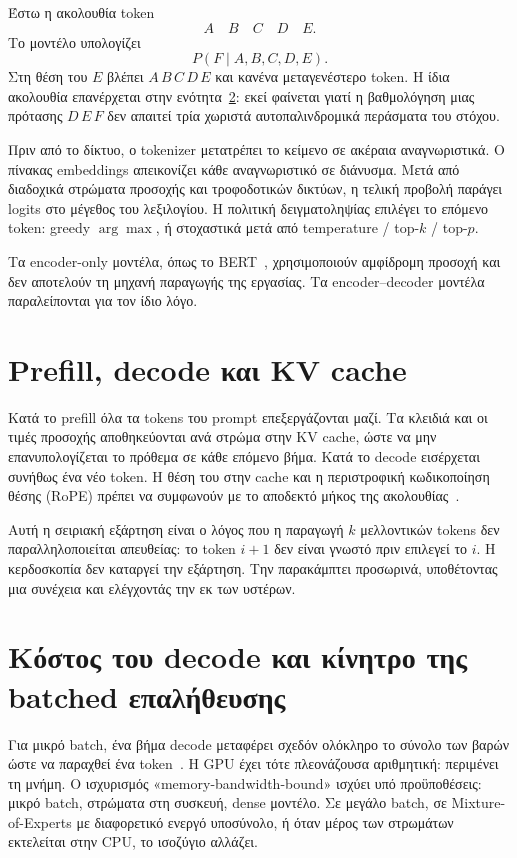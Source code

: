 \documentclass[a4paper,12pt]{report}
\theoremstyle{plain}
\theoremstyle{definition}
\theoremstyle{remark}
\begin{document}
Έστω η ακολουθία token
\[
  A \quad B \quad C \quad D \quad E.
\]
Το μοντέλο υπολογίζει
\[
  P(F \mid A,B,C,D,E).
\]
Στη θέση του \(E\) βλέπει \(A\,B\,C\,D\,E\) και κανένα μεταγενέστερο token.
Η ίδια ακολουθία επανέρχεται στην ενότητα~\ref{sec:batched-verify}:
εκεί φαίνεται
γιατί η βαθμολόγηση μιας πρότασης \(D\,E\,F\) δεν απαιτεί τρία χωριστά
αυτοπαλινδρομικά περάσματα του στόχου.

Πριν από το δίκτυο, ο tokenizer μετατρέπει το κείμενο σε ακέραια
αναγνωριστικά. Ο πίνακας embeddings απεικονίζει κάθε αναγνωριστικό σε
διάνυσμα. Μετά από διαδοχικά στρώματα προσοχής και τροφοδοτικών δικτύων, η
τελική προβολή παράγει logits στο μέγεθος του λεξιλογίου. Η πολιτική
δειγματοληψίας επιλέγει το επόμενο token: greedy \(\arg\max\), ή στοχαστικά
μετά από temperature / top-\(k\) / top-\(p\).

Τα encoder-only μοντέλα, όπως το BERT~\cite{devlin2019bert}, χρησιμοποιούν
αμφίδρομη προσοχή και δεν αποτελούν τη μηχανή παραγωγής της εργασίας. Τα
encoder--decoder μοντέλα παραλείπονται για τον ίδιο λόγο.

\section{Prefill, decode και KV cache}

Κατά το prefill όλα τα tokens του prompt επεξεργάζονται μαζί. Τα κλειδιά και
οι τιμές προσοχής αποθηκεύονται ανά στρώμα στην KV cache, ώστε να μην
επανυπολογίζεται το πρόθεμα σε κάθε επόμενο βήμα. Κατά το decode εισέρχεται
συνήθως ένα νέο token. Η θέση του στην cache και η περιστροφική κωδικοποίηση
θέσης (RoPE) πρέπει να συμφωνούν με το αποδεκτό μήκος της
ακολουθίας~\cite{su2024roformer}.

Αυτή η σειριακή εξάρτηση είναι ο λόγος που η παραγωγή \(k\) μελλοντικών
tokens δεν παραλληλοποιείται απευθείας: το token \(i+1\) δεν είναι γνωστό πριν
επιλεγεί το \(i\). Η κερδοσκοπία δεν καταργεί την εξάρτηση. Την παρακάμπτει
προσωρινά, υποθέτοντας μια συνέχεια και ελέγχοντάς την εκ των υστέρων.

\section{Κόστος του decode και κίνητρο της batched επαλήθευσης}
\label{sec:batched-verify}

Για μικρό batch, ένα βήμα decode μεταφέρει σχεδόν ολόκληρο το σύνολο των
βαρών ώστε να παραχθεί ένα token~\cite{shazeer2019fast,pope2023efficiently}.
Η GPU έχει τότε πλεονάζουσα αριθμητική: περιμένει τη μνήμη. Ο ισχυρισμός
«memory-bandwidth-bound» ισχύει υπό προϋποθέσεις: μικρό batch, στρώματα στη
συσκευή, dense μοντέλο. Σε μεγάλο batch, σε Mixture-of-Experts με διαφορετικό
ενεργό υποσύνολο, ή όταν μέρος των στρωμάτων εκτελείται στην CPU, το ισοζύγιο
αλλάζει.
\end{document}
